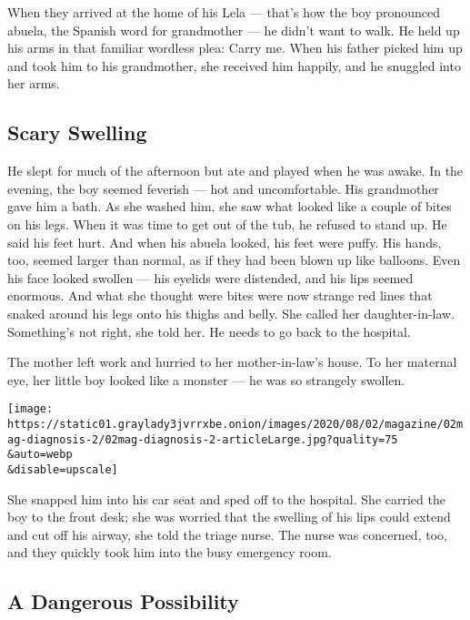 When they arrived at the home of his Lela --- that's how the boy
pronounced abuela, the Spanish word for grandmother --- he didn't want
to walk. He held up his arms in that familiar wordless plea: Carry me.
When his father picked him up and took him to his grandmother, she
received him happily, and he snuggled into her arms.

\hypertarget{scary-swelling}{%
\subsection{\texorpdfstring{\textbf{Scary
Swelling}}{Scary Swelling}}\label{scary-swelling}}

He slept for much of the afternoon but ate and played when he was awake.
In the evening, the boy seemed feverish --- hot and uncomfortable. His
grandmother gave him a bath. As she washed him, she saw what looked like
a couple of bites on his legs. When it was time to get out of the tub,
he refused to stand up. He said his feet hurt. And when his abuela
looked, his feet were puffy. His hands, too, seemed larger than normal,
as if they had been blown up like balloons. Even his face looked swollen
--- his eyelids were distended, and his lips seemed enormous. And what
she thought were bites were now strange red lines that snaked around his
legs onto his thighs and belly. She called her daughter-in-law.
Something's not right, she told her. He needs to go back to the
hospital.

The mother left work and hurried to her mother-in-law's house. To her
maternal eye, her little boy looked like a monster --- he was so
strangely swollen.

\texttt{[image: https://static01.graylady3jvrrxbe.onion/images/2020/08/02/magazine/02mag-diagnosis-2/02mag-diagnosis-2-articleLarge.jpg?quality=75\\\&auto=webp\\\&disable=upscale]}

She snapped him into his car seat and sped off to the hospital. She
carried the boy to the front desk; she was worried that the swelling of
his lips could extend and cut off his airway, she told the triage nurse.
The nurse was concerned, too, and they quickly took him into the busy
emergency room.

\hypertarget{a-dangerous-possibility}{%
\subsection{\texorpdfstring{\textbf{A Dangerous
Possibility}}{A Dangerous Possibility}}\label{a-dangerous-possibility}}

